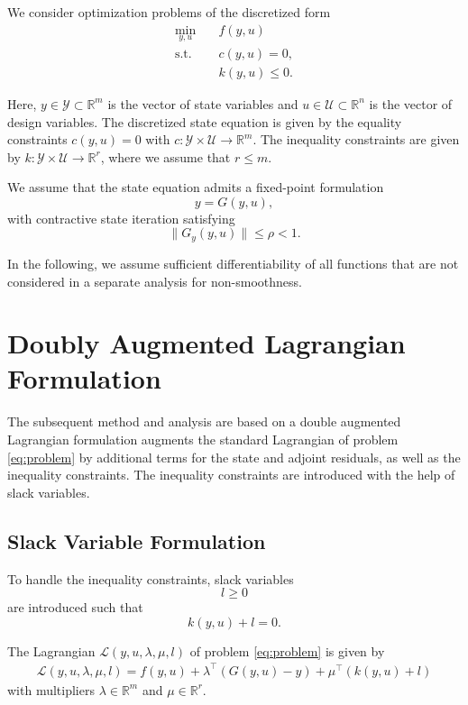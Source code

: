 \documentclass[11pt]{article}
\newcommand{\Lag}{\mathcal L}
\begin{document}
We consider optimization problems of the discretized form
\begin{equation}
\begin{aligned}
\min_{y,u}\quad & f(y,u)
\\
\text{s.t.}\quad &
c(y,u)=0,
\\
&
k(y,u)\le 0.
\end{aligned}
\label{eq:problem}
\end{equation}

Here, $y\in \mathcal{Y} \subset \mathbb{R}^m$ is the vector of state variables and $u \in \mathcal{U} \subset \mathbb{R}^n$ is the vector of design variables. The discretized state equation is given by the equality constraints $c(y,u)=0$ with $c:\mathcal{Y}\times\mathcal{U} \rightarrow \mathbb{R}^m.$ The inequality constraints are given by $k: \mathcal{Y}\times\mathcal{U} \rightarrow \mathbb{R}^r$, where we assume that $r \leq m.$ 

We assume that the state equation admits a fixed-point formulation
\begin{equation}
y=G(y,u),
\label{eq:fixedpoint}
\end{equation}
with contractive state iteration satisfying
\[
\|G_y(y,u)\|\le \rho <1.
\]

In the following, we assume sufficient differentiability of all functions that are not considered in a separate analysis for non-smoothness. 

\section{Doubly Augmented Lagrangian Formulation}

The subsequent method and analysis are based on a double augmented Lagrangian formulation augments the standard Lagrangian of problem \eqref{eq:problem} by additional terms for the state and adjoint residuals, as well as the inequality constraints. The inequality constraints are introduced with the help of slack variables. 

\subsection{Slack Variable Formulation}

To handle the inequality constraints, slack variables
\[
l\ge 0
\]
are introduced such that
\begin{equation}
k(y,u)+l=0.
\end{equation}

The Lagrangian $\Lag(y,u,\lambda,\mu,l)$ of problem \ref{eq:problem} is given by
\begin{align}
    \Lag(y,u,\lambda,\mu,l) = f(y,u)
+ \lambda^\top(G(y,u)-y)
+ \mu^\top(k(y,u)+l)
\end{align}
with multipliers $\lambda \in \mathbb{R}^m$ and $\mu \in \mathbb{R}^r.$ 
\end{document}
